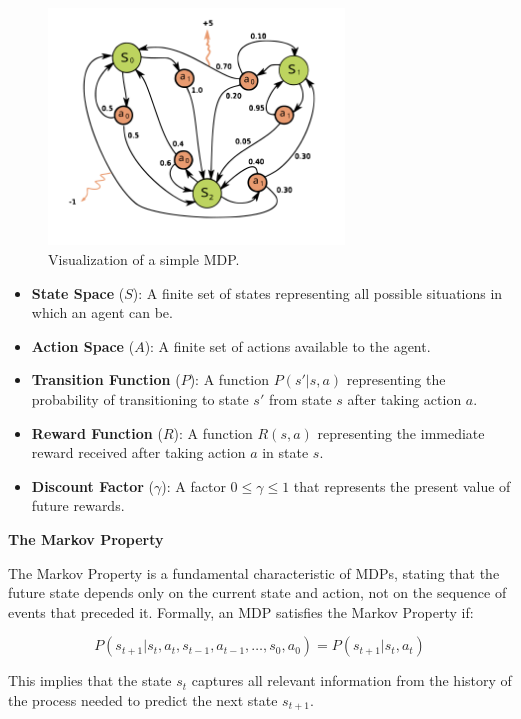 \documentclass[../Main.tex]{subfiles}
\begin{document}
\begin{figure}[H]
    \centering
    \includegraphics[width=0.7\textwidth]{img/mdp.png}
    \caption{Visualization of a simple MDP.}
\end{figure}

\begin{itemize}
    \item \textbf{State Space} ($S$): A finite set of states representing all possible situations in which an agent can be.
    \item \textbf{Action Space} ($A$): A finite set of actions available to the agent.
    \item \textbf{Transition Function} ($P$): A function $P(s'|s,a)$ representing the probability of transitioning to state $s'$ from state $s$ after taking action $a$.
    \item \textbf{Reward Function} ($R$): A function $R(s,a)$ representing the immediate reward received after taking action $a$ in state $s$.
    \item \textbf{Discount Factor} ($\gamma$): A factor $0 \leq \gamma \leq 1$ that represents the present value of future rewards.
\end{itemize}

\textbf{The Markov Property}

The Markov Property is a fundamental characteristic of MDPs, stating that the future state depends only on the current state and action, not on the sequence of events that preceded it. Formally, an MDP satisfies the Markov Property if:

\begin{equation}
    P(s_{t+1} | s_t, a_t, s_{t-1}, a_{t-1}, \ldots, s_0, a_0) = P(s_{t+1} | s_t, a_t)
\end{equation}

This implies that the state $s_t$ captures all relevant information from the history of the process needed to predict the next state $s_{t+1}$.
\end{document}
